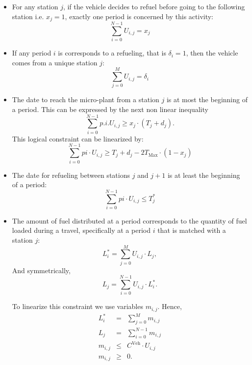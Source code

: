 \documentclass[11pt]{article}
\theoremstyle{plain}%
\theoremstyle{definition} \newtheorem{lem}{Lemma}[section]
\theoremstyle{definition} \newtheorem{claim}{Claim}[lem]
\theoremstyle{definition} \newtheorem{theorem}{Theorem}[section]
\theoremstyle{definition} \newtheorem{exo}{Exercice n$^\circ$}
\theoremstyle{definition} \newtheorem{quest}{}[exo]
\theoremstyle{definition} \newtheorem{sousquest}{}[quest]
\theoremstyle{remark}
\theoremstyle{definition}
\begin{document}
\begin{enumerate}
\begin{itemize}
\item For any station $j$, if the vehicle decides to refuel before going to the following station i.e. $x_j=1$, exactly one period is concerned by this activity: 
$$\sum_{i=0}^{ N-1} U_{i,j}=x_j$$
%
\item If any period $i$ is corresponds to a refueling, that is $\delta_i=1$, then the vehicle comes from a unique  station $j$:
$$\sum_{j=0}^{ M} U_{i,j}=\delta_i$$
\item The  date to reach the micro-plant from a station $j$ is at most the beginning of a period.
This can be expressed by the next non linear inequality 
 $$ \sum_{i=0}^{N-1} p.i.U_{i,j}\geq x_j \cdot (T_j + d_j).$$
This logical constraint can be linearized by: 
$$\sum_{i=0}^{ N-1} p i \cdot U_{i,j}  \geq T_j + d_j - 2 T_{\textrm{Max}}  \cdot (1-x_j)$$
\item The date for refueling between stations $j$ and $j+1$ 
is at least the beginning of a period:
$$\sum_{i=0}^{ N-1} pi \cdot U_{i,j} \le  T^*_j$$
\item The amount of fuel distributed at a period
corresponds to the quantity of fuel loaded during a travel, specifically at a period $i$ that is matched with a station $j$:
 $$L^*_i = \sum_{j=0}^{ M} U_{i,j} \cdot L_j,$$
And symmetrically,
	 $$L_j = \sum_{i=0}^{ N-1} U_{i,j} \cdot L^*_i.$$

To linearize this constraint we
use variables $m_{i,j}$. Hence,
\begin{displaymath}
\begin{array}{lcl}
	L^*_i & = & \sum_{j=0}^{ M} m_{i,j} \\
	L_j & =  & \sum_{i=0}^{ N-1} m_{i,j} \\
	m_{i, j} & \le & C^{\textrm{Veh}} \cdot U_{i,j} \\
	m_{i, j} & \geq & 0.
\end{array}
\end{displaymath}

\end{itemize}
\end{enumerate}
\end{document}

